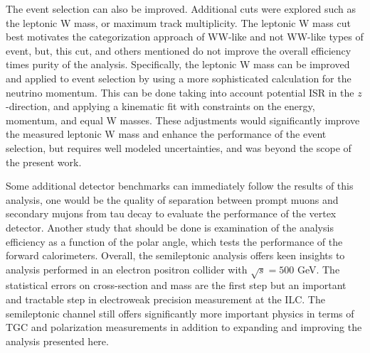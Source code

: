 The event selection can also be improved. Additional cuts were explored such as the leptonic W mass, or maximum track multiplicity. The leptonic W mass cut best motivates the categorization approach of WW-like and not WW-like types of event, but, this cut, and others mentioned do not improve the overall efficiency times purity of the analysis.  Specifically, the leptonic W mass can be improved and applied to event selection by using a more sophisticated calculation for the neutrino momentum. This can be done taking into account potential ISR in the $z$-direction, and applying a kinematic fit with constraints on the energy, momentum, and equal W masses. These adjustments would significantly improve the measured leptonic W mass and enhance the performance of the event selection, but requires well modeled uncertainties, and was beyond the scope of the present work. 
 
Some additional detector benchmarks can immediately follow the results of this analysis, one would be the quality of separation between prompt muons and secondary mujons from tau decay to evaluate the performance of the vertex detector. Another study that should be done is examination of the analysis efficiency as a function of the polar angle, which tests the performance of the forward calorimeters.  Overall, the semileptonic analysis offers keen insights to analysis performed in an electron positron collider with $\sqrt{s} = 500$ GeV. The statistical errors on cross-section and mass are the first step but an important and tractable step in electroweak precision measurement at the ILC.  The semileptonic channel still offers significantly more important physics in terms of TGC and polarization measurements in addition to expanding and improving the analysis presented here. 